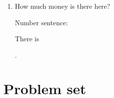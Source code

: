 \documentclass{tufte-book}
\begin{document}
\begin{enumerate}
\item {}
How much money is there here?\medskip

Number sentence: \dotfill\medskip

There is \dotfill\medskip\par\mbox{}\dotfill\medskip\par\mbox{}\dotfill\bigskip.

\end{enumerate}



\clearpage\section{Problem set }
\end{document}
